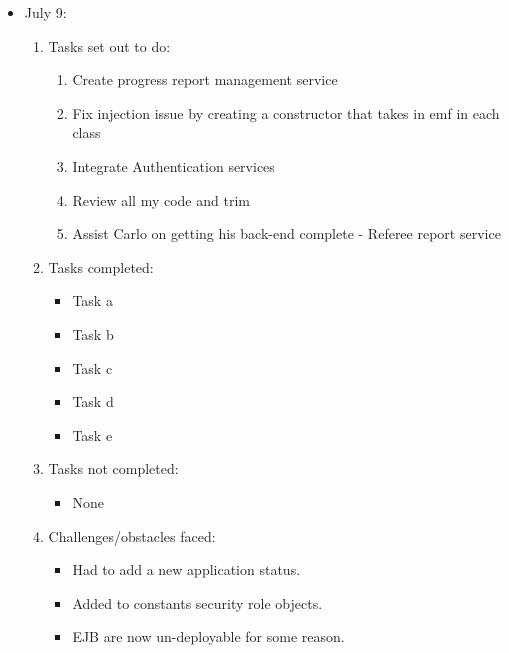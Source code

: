 \documentclass[12pt]{article}
\begin{document}
	\begin{itemize}
		\item July 9:
		\begin{enumerate}
			\item Tasks set out to do:
			\begin{enumerate}
				\item Create progress report management service
				\item Fix injection issue by creating a constructor that takes in emf in each class
				\item Integrate Authentication services
				\item Review all my code and trim
				\item Assist Carlo on getting his back-end complete - Referee report service			
			\end{enumerate}
			\item Tasks completed:
			\begin{itemize}
				\item Task a
				\item Task b
				\item Task c
				\item Task d
				\item Task e
			\end{itemize}
			\item Tasks not completed:
			\begin{itemize}
				\item None
			\end{itemize}
			\item Challenges/obstacles faced:
			\begin{itemize}
				\item Had to add a new application status.
				\item Added to constants security role objects.
				\item EJB are now un-deployable for some reason.		
			\end{itemize}			
		\end{enumerate}
	\end{itemize}
	
\end{document}
